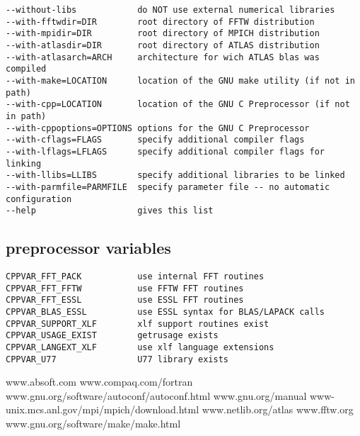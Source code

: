 \documentclass[a4paper,10pt]{article}
\begin{document}
\begin{verbatim}
--without-libs            do NOT use external numerical libraries
--with-fftwdir=DIR        root directory of FFTW distribution
--with-mpidir=DIR         root directory of MPICH distribution
--with-atlasdir=DIR       root directory of ATLAS distribution
--with-atlasarch=ARCH     architecture for wich ATLAS blas was compiled 
--with-make=LOCATION      location of the GNU make utility (if not in path)
--with-cpp=LOCATION       location of the GNU C Preprocessor (if not in path)
--with-cppoptions=OPTIONS options for the GNU C Preprocessor
--with-cflags=FLAGS       specify additional compiler flags
--with-lflags=LFLAGS      specify additional compiler flags for linking
--with-llibs=LLIBS        specify additional libraries to be linked
--with-parmfile=PARMFILE  specify parameter file -- no automatic configuration
--help                    gives this list
\end{verbatim}

\subsection*{preprocessor variables}

\begin{verbatim}
CPPVAR_FFT_PACK           use internal FFT routines
CPPVAR_FFT_FFTW           use FFTW FFT routines
CPPVAR_FFT_ESSL           use ESSL FFT routines
CPPVAR_BLAS_ESSL          use ESSL syntax for BLAS/LAPACK calls 
CPPVAR_SUPPORT_XLF        xlf support routines exist 
CPPVAR_USAGE_EXIST        getrusage exists
CPPVAR_LANGEXT_XLF        use xlf language extensions
CPPVAR_U77                U77 library exists
\end{verbatim}


\begin{thebibliography}{99}
 www.absoft.com
 www.compaq.com/fortran
 www.gnu.org/software/autoconf/autoconf.html
 www.gnu.org/manual
 www-unix.mcs.anl.gov/mpi/mpich/download.html
 www.netlib.org/atlas
 www.fftw.org
 www.gnu.org/software/make/make.html
\end{thebibliography}
\end{document}
